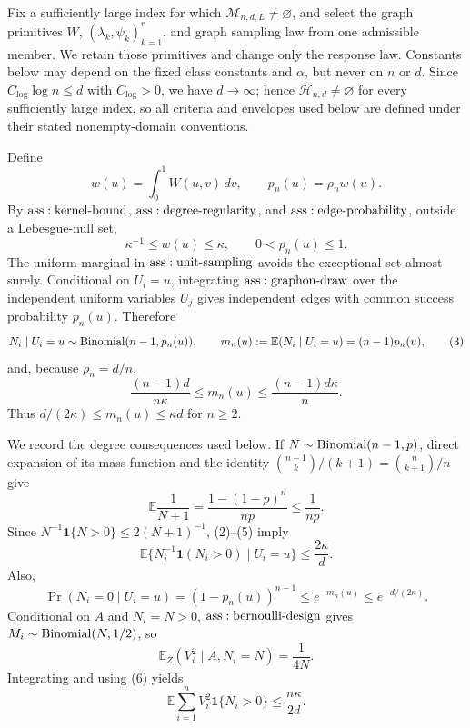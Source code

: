 Fix a sufficiently large index for which \(\mathcal M_{n,d,L}\ne\varnothing\), and select the graph primitives \(W\), \((\lambda_k,\psi_k)_{k=1}^r\), and graph sampling law from one admissible member.  We retain those primitives and change only the response law.  Constants below may depend on the fixed class constants and \(\alpha\), but never on \(n\) or \(d\).  Since \(C_{\log}\log n\leq d\) with \(C_{\log}>0\), we have \(d\to\infty\); hence \(\mathcal H_{n,d}\ne\varnothing\) for every sufficiently large index, so all criteria and envelopes used below are defined under their stated nonempty-domain conventions.

Define
\[
 w(u)=\int_0^1W(u,v)\,dv,
 \qquad p_n(u)=\rho_nw(u).
\tag{1}
\]
By \({\rm ass:kernel\text{-}bound}\), \({\rm ass:degree\text{-}regularity}\), and \({\rm ass:edge\text{-}probability}\), outside a Lebesgue-null set,
\[
 \kappa^{-1}\leq w(u)\leq\kappa,
 \qquad 0<p_n(u)\leq1.
\tag{2}
\]
The uniform marginal in \({\rm ass:unit\text{-}sampling}\) avoids the exceptional set almost surely.  Conditional on \(U_i=u\), integrating \({\rm ass:graphon\text{-}draw}\) over the independent uniform variables \(U_j\) gives independent edges with common success probability \(p_n(u)\).  Therefore
\[
 N_i\mid U_i=u\sim{\rm Binomial}(n-1,p_n(u)),
 \qquad m_n(u):=\mathbb E(N_i\mid U_i=u)=(n-1)p_n(u),
\tag{3}
\]
and, because \(\rho_n=d/n\),
\[
 \frac{(n-1)d}{n\kappa}\leq m_n(u)
 \leq\frac{(n-1)d\kappa}{n}.
\tag{4}
\]
Thus \(d/(2\kappa)\leq m_n(u)\leq\kappa d\) for \(n\geq2\).

We record the degree consequences used below.  If \(N\sim{\rm Binomial}(n-1,p)\), direct expansion of its mass function and the identity \({n-1\choose k}/(k+1)={n\choose k+1}/n\) give
\[
 \mathbb E\frac1{N+1}
 =\frac{1-(1-p)^n}{np}\leq\frac1{np}.
\tag{5}
\]
Since \(N^{-1}\mathbf1\{N>0\}\leq2(N+1)^{-1}\), (2)--(5) imply
\[
 \mathbb E\{N_i^{-1}\mathbf1(N_i>0)\mid U_i=u\}
 \leq\frac{2\kappa}{d}.
\tag{6}
\]
Also,
\[
 \Pr(N_i=0\mid U_i=u)=(1-p_n(u))^{n-1}
 \leq e^{-m_n(u)}\leq e^{-d/(2\kappa)}.
\tag{7}
\]
Conditional on \(A\) and \(N_i=N>0\), \({\rm ass:bernoulli\text{-}design}\) gives \(M_i\sim{\rm Binomial}(N,1/2)\), so
\[
 \mathbb E_Z(V_i^2\mid A,N_i=N)=\frac1{4N}.
\]
Integrating and using (6) yields
\[
 \mathbb E\sum_{i=1}^nV_i^2\mathbf1\{N_i>0\}
 \leq\frac{n\kappa}{2d}.
\tag{8}
\]

